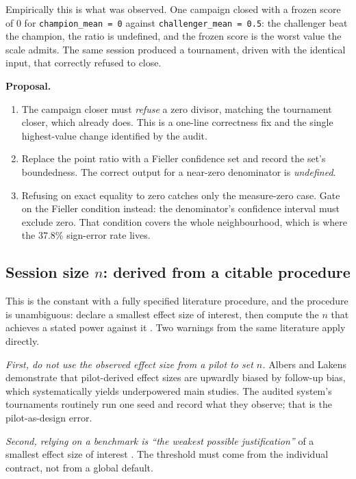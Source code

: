 \documentclass[11pt,letterpaper]{article}
\newcommand{\code}[1]{\texttt{#1}}
\newcommand{\bs}{\allowbreak\hspace{0pt}}
\begin{document}
Empirically this is what was observed. One campaign closed with a frozen score of
$0$ for \code{champion\bs \_mean = 0} against \code{challenger\bs \_mean = 0.5}: the
challenger beat the champion, the ratio is undefined, and the frozen score is the
worst value the scale admits. The same session produced a tournament, driven with
the identical input, that correctly refused to close.

\textbf{Proposal.}
\begin{enumerate}
\item The campaign closer must \emph{refuse} a zero divisor, matching the
tournament closer, which already does. This is a one-line correctness fix and the
single highest-value change identified by the audit.
\item Replace the point ratio with a Fieller confidence set and record the set's
boundedness. The correct output for a near-zero denominator is \emph{undefined}.
\item Refusing on exact equality to zero catches only the measure-zero case. Gate
on the Fieller condition instead: the denominator's confidence interval must
exclude zero. That condition covers the whole neighbourhood, which is where the
$37.8\%$ sign-error rate lives.
\end{enumerate}

\subsection{Session size $n$: derived from a citable procedure}
\label{sec:n}

This is the constant with a fully specified literature procedure, and the
procedure is unambiguous: declare a smallest effect size of interest, then compute
the $n$ that achieves a stated power against it \cite{lakens2018sesoi,albers2018}.
Two warnings from the same literature apply directly.

\emph{First, do not use the observed effect size from a pilot to set $n$.}
Albers and Lakens \cite{albers2018} demonstrate that pilot-derived effect sizes are
upwardly biased by follow-up bias, which systematically yields underpowered main
studies. The audited system's tournaments routinely run one seed and record what
they observe; that is the pilot-as-design error.

\emph{Second, relying on a benchmark is ``the weakest possible justification''} of a
smallest effect size of interest \cite{lakens2018sesoi}. The threshold must come
from the individual contract, not from a global default.
\end{document}
